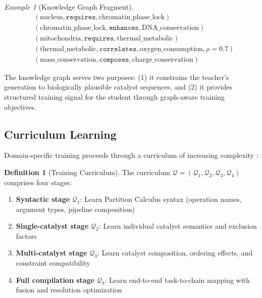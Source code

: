 \documentclass[11pt,twocolumn,a4paper]{article}
\theoremstyle{definition}
\newtheorem{definition}[theorem]{Definition}
\theoremstyle{remark}
\newtheorem{example}[theorem]{Example}
\begin{document}
\begin{example}[Knowledge Graph Fragment]
\begin{align}
&(\text{nucleus}, \texttt{requires}, \text{chromatin\_phase\_lock}) \\
&(\text{chromatin\_phase\_lock}, \texttt{enhances}, \text{DNA\_conservation}) \\
&(\text{mitochondria}, \texttt{requires}, \text{thermal\_metabolic}) \\
&(\text{thermal\_metabolic}, \texttt{correlates}, \text{oxygen\_consumption}, \rho = 0.7) \\
&(\text{mass\_conservation}, \texttt{composes}, \text{charge\_conservation})
\end{align}
\end{example}

The knowledge graph serves two purposes: (1) it constrains the teacher's generation to biologically plausible catalyst sequences, and (2) it provides structured training signal for the student through graph-aware training objectives.

\subsection{Curriculum Learning}

Domain-specific training proceeds through a curriculum of increasing complexity \cite{Bengio2009}:

\begin{definition}[Training Curriculum]
\label{def:curriculum}
The curriculum $\mathcal{Q} = (\mathcal{Q}_1, \mathcal{Q}_2, \mathcal{Q}_3, \mathcal{Q}_4)$ comprises four stages:
\begin{enumerate}
    \item \textbf{Syntactic stage} $\mathcal{Q}_1$: Learn Partition Calculus syntax (operation names, argument types, pipeline composition)
    \item \textbf{Single-catalyst stage} $\mathcal{Q}_2$: Learn individual catalyst semantics and exclusion factors
    \item \textbf{Multi-catalyst stage} $\mathcal{Q}_3$: Learn catalyst composition, ordering effects, and constraint compatibility
    \item \textbf{Full compilation stage} $\mathcal{Q}_4$: Learn end-to-end task-to-chain mapping with fusion and resolution optimization
\end{enumerate}
\end{definition}
\end{document}
